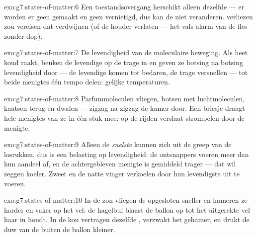 \begin{solution}{exo:g7:states-of-matter:6}
Een toestandsovergang herschikt alleen dezelfde  --- er
worden er geen gemaakt en geen vernietigd, dus kan de  niet
veranderen.  verliezen zou vereisen dat  verdwijnen
(of de houder verlaten --- het vals alarm van de fles zonder dop).
\end{solution}

\begin{solution}{exo:g7:states-of-matter:7}
De levendigheid van de moleculaire beweging. Als heet koud raakt,
beuken de levendige  op de trage in en geven ze botsing na
botsing levendigheid door --- de levendige komen tot bedaren, de trage
versnellen --- tot beide menigtes één tempo delen: gelijke
temperaturen.
\end{solution}

\begin{solution}{exo:g7:states-of-matter:8}
Parfummoleculen vliegen, botsen met luchtmoleculen, kaatsen
terug en dwalen --- zigzag na zigzag de kamer door. Een briesje draagt
hele menigtes van ze in één stuk mee: op de  rijden verslaat
strompelen door de menigte.
\end{solution}

\begin{solution}{exo:g7:states-of-matter:9}
Alleen de \emph{snelste}  kunnen zich uit de greep van de
 losrukken, dus is  een belasting op
levendigheid: de ontsnappers voeren meer dan hun aandeel af, en de
achtergebleven menigte is gemiddeld trager --- dat wil zeggen koeler.
Zweet en de natte vinger verkoelen door hun levendigste uit te voeren.
\end{solution}

\begin{solution}{exo:g7:states-of-matter:10}
In de zon vliegen de opgesloten  sneller en hameren ze harder
en vaker op het vel: de hagelbui blaast de ballon op tot het
uitgerekte vel haar in  houdt. In de kou vertragen dezelfde
, verzwakt het gehamer, en drukt de duw van de 
buiten de ballon kleiner.
\end{solution}

